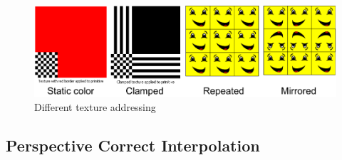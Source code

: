 \documentclass[twocolumn,landscape,10pt]{article}
\theoremstyle{definition}
\begin{document}
\begin{figure}
  	\includegraphics[scale=0.30]{texture_addressing.png}
  	\centering
  	\caption{Different texture addressing}\label{fig:texture_addressing}
\end{figure}


\subsection{Perspective Correct Interpolation}
\end{document}
